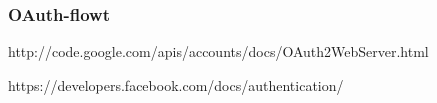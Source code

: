 \documentclass[finnish,gradu]{tktltiki}
\begin{document}

  \subsubsection{OAuth-flowt} %
  \label{ssub:oauth_flowt}
  http://code.google.com/apis/accounts/docs/OAuth2WebServer.html

  https://developers.facebook.com/docs/authentication/




\end{document}
